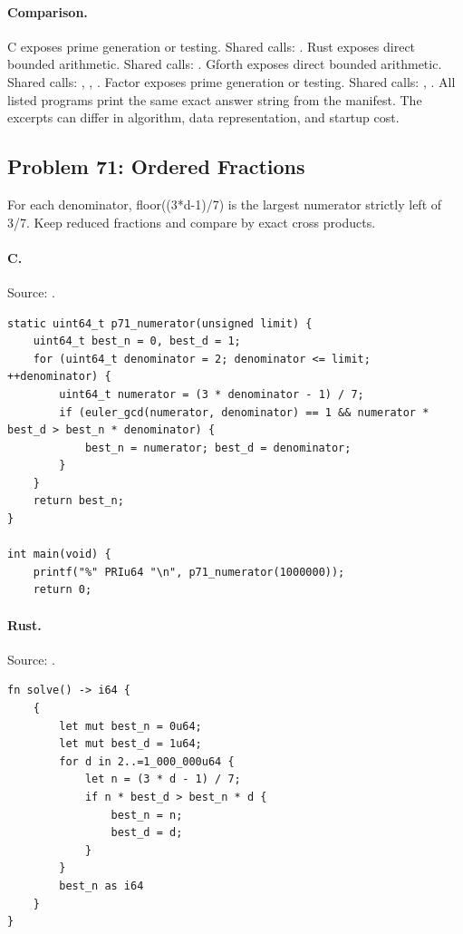\paragraph{Comparison.}
C exposes prime generation or testing. Shared calls: \texttt{}. Rust exposes direct bounded arithmetic. Shared calls: \texttt{}. Gforth exposes direct bounded arithmetic. Shared calls: \texttt{}, \texttt{}, \texttt{}. Factor exposes prime generation or testing. Shared calls: \texttt{}, \texttt{}.
All listed programs print the same exact answer string from the manifest. The excerpts can differ in algorithm, data representation, and startup cost.

\subsection{Problem 71: Ordered Fractions}
\label{walkthrough:p71}
For each denominator, floor((3*d-1)/7) is the largest numerator strictly left of 3/7. Keep reduced fractions and compare by exact cross products.

\paragraph{C.} Source: .
\begin{lstlisting}
static uint64_t p71_numerator(unsigned limit) {
    uint64_t best_n = 0, best_d = 1;
    for (uint64_t denominator = 2; denominator <= limit; ++denominator) {
        uint64_t numerator = (3 * denominator - 1) / 7;
        if (euler_gcd(numerator, denominator) == 1 && numerator * best_d > best_n * denominator) {
            best_n = numerator; best_d = denominator;
        }
    }
    return best_n;
}

int main(void) {
    printf("%" PRIu64 "\n", p71_numerator(1000000));
    return 0;
\end{lstlisting}

\paragraph{Rust.} Source: .
\begin{lstlisting}
fn solve() -> i64 {
    {
        let mut best_n = 0u64;
        let mut best_d = 1u64;
        for d in 2..=1_000_000u64 {
            let n = (3 * d - 1) / 7;
            if n * best_d > best_n * d {
                best_n = n;
                best_d = d;
            }
        }
        best_n as i64
    }
}
\end{lstlisting}

